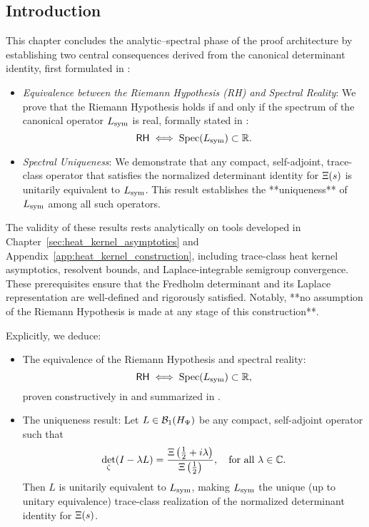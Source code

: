 \subsection*{Introduction}
\label{sec:intro_spectral_implications}

This chapter concludes the analytic–spectral phase of the proof architecture by establishing two central consequences derived from the canonical determinant identity, first formulated in :

\begin{itemize}
  \item \emph{Equivalence between the Riemann Hypothesis (RH) and Spectral Reality}: We prove that the Riemann Hypothesis holds if and only if the spectrum of the canonical operator \( L_{\mathrm{sym}} \) is real, formally stated in :
  \[
  \mathsf{RH} \iff \operatorname{Spec}(L_{\mathrm{sym}}) \subset \mathbb{R}.
  \]
  
  \item \emph{Spectral Uniqueness}: We demonstrate that any compact, self-adjoint, trace-class operator that satisfies the normalized determinant identity for \( \Xi(s) \) is unitarily equivalent to \( L_{\mathrm{sym}} \). This result establishes the **uniqueness** of \( L_{\mathrm{sym}} \) among all such operators.
\end{itemize}

The validity of these results rests analytically on tools developed in Chapter~\ref{sec:heat_kernel_asymptotics} and Appendix~\ref{app:heat_kernel_construction}, including trace-class heat kernel asymptotics, resolvent bounds, and Laplace-integrable semigroup convergence. These prerequisites ensure that the Fredholm determinant and its Laplace representation are well-defined and rigorously satisfied. Notably, **no assumption of the Riemann Hypothesis is made at any stage of this construction**.

\medskip

Explicitly, we deduce:

\begin{itemize}
  \item The equivalence of the Riemann Hypothesis and spectral reality:
  \[
  \mathsf{RH} \iff \operatorname{Spec}(L_{\mathrm{sym}}) \subset \mathbb{R},
  \]
  proven constructively in  and summarized in .
  
  \item The uniqueness result: Let \( L \in \mathcal{B}_1(H_{\Psi}) \) be any compact, self-adjoint operator such that
  \[
  \det_\zeta(I - \lambda L) = \frac{\Xi\left(\frac{1}{2} + i\lambda\right)}{\Xi\left(\frac{1}{2}\right)}, \quad \text{for all } \lambda \in \mathbb{C}.
  \]
  Then \( L \) is unitarily equivalent to \( L_{\mathrm{sym}} \), making \( L_{\mathrm{sym}} \) the unique (up to unitary equivalence) trace-class realization of the normalized determinant identity for \( \Xi(s) \).
\end{itemize}

